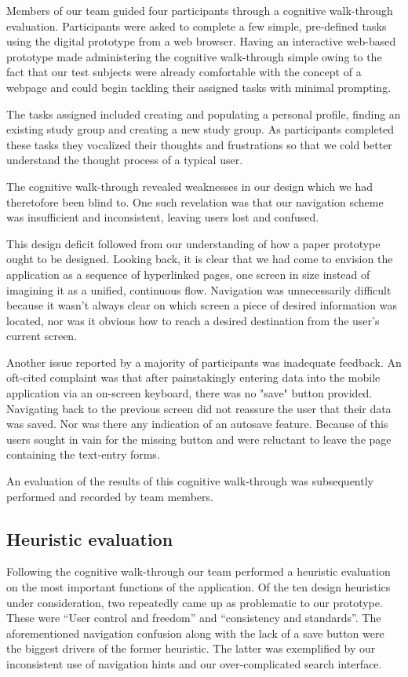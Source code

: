 \documentclass{sigchi-ext}
\begin{document}
Members of our team guided four participants through a cognitive walk-through
evaluation. Participants were asked to complete a few simple, pre-defined tasks
using the digital prototype from a web browser. Having an interactive
web-based prototype made administering the cognitive walk-through simple owing
to the fact that our test subjects were already comfortable with the concept of
a webpage and could begin tackling their assigned tasks with minimal prompting.

The tasks assigned included creating and populating a personal profile, finding an existing study
group and creating a new study group. As participants completed these tasks they vocalized their
thoughts and frustrations so that we cold better understand the thought process of a typical user.

The cognitive walk-through revealed weaknesses in our design which we had theretofore been blind to.
One such revelation was that our navigation scheme was insufficient and inconsistent, leaving users
lost and confused.

This design deficit followed from our understanding of how a paper prototype
ought to be designed. Looking back, it is clear that we had come to envision
the application as a sequence of hyperlinked pages, one screen in size instead
of imagining it as a unified, continuous flow.  Navigation was unnecessarily
difficult because it wasn't always clear on which screen a piece of desired
information was located, nor was it obvious how to reach a desired destination
from the user's current screen.

Another issue reported by a majority of participants was inadequate feedback.
An oft-cited complaint was that after painstakingly entering data into the
mobile application via an on-screen keyboard, there was no "save" button
provided. Navigating back to the previous screen did not reassure the user that
their data was saved. Nor was there any indication of an autosave feature.
Because of this users sought in vain for the missing button and were reluctant
to leave the page containing the text-entry forms.

An evaluation of the results of this cognitive walk-through was subsequently
performed and recorded by team members.


\subsection{Heuristic evaluation}

Following the cognitive walk-through our team performed a heuristic evaluation on the most important
functions of the application. Of the ten design heuristics under consideration, two repeatedly came
up as problematic to our prototype. These were ``User control and freedom'' and ``consistency and
standards''. The aforementioned navigation confusion along with the lack of a save button were the
biggest drivers of the former heuristic. The latter was exemplified by our inconsistent use of
navigation hints and our over-complicated search interface.
\end{document}

